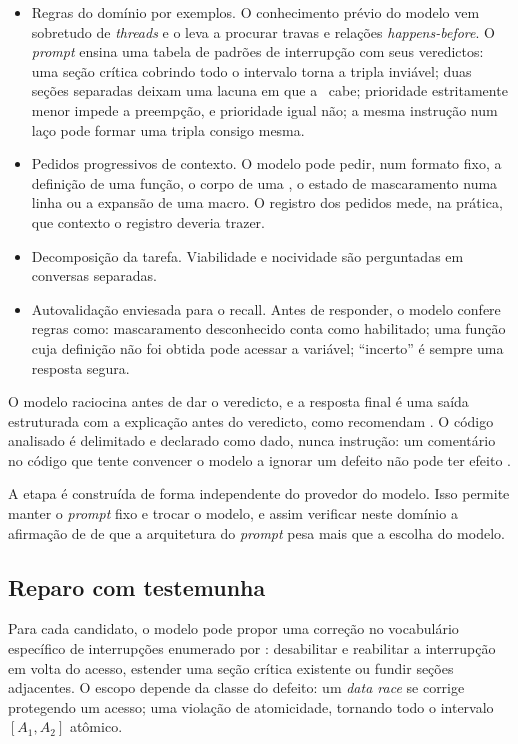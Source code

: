 \begin{itemize}
  \item Regras do domínio por exemplos. O conhecimento prévio do modelo
    vem sobretudo de \textit{threads} e o leva a procurar travas e relações
    \textit{happens-before}. O \textit{prompt} ensina uma tabela de padrões de
    interrupção com seus veredictos: uma seção crítica cobrindo todo o intervalo
    torna a tripla inviável; duas seções separadas deixam uma lacuna em que a
    \isr\ cabe; prioridade estritamente menor impede a preempção, e prioridade
    igual não; a mesma instrução num laço pode formar uma tripla consigo mesma.
  \item Pedidos progressivos de contexto. O modelo pode pedir, num
    formato fixo, a definição de uma função, o corpo de uma \isr, o estado de
    mascaramento numa linha ou a expansão de uma macro. O registro dos pedidos
    mede, na prática, que contexto o registro deveria trazer.
  \item Decomposição da tarefa. Viabilidade e nocividade são perguntadas
    em conversas separadas.
  \item Autovalidação enviesada para o recall. Antes de responder, o
    modelo confere regras como: mascaramento desconhecido conta como
    habilitado; uma função cuja definição não foi obtida pode acessar a
    variável; ``incerto'' é sempre uma resposta segura.
\end{itemize}

O modelo raciocina antes de dar o veredicto, e a resposta final é uma saída
estruturada com a explicação antes do veredicto, como recomendam
. O código analisado é delimitado e declarado como
dado, nunca instrução: um comentário no código que tente convencer o
modelo a ignorar um defeito não pode ter efeito \cite{sastgenius}.

A etapa é construída de forma independente do provedor do modelo. Isso permite
manter o \textit{prompt} fixo e trocar o modelo, e assim verificar neste domínio a
afirmação de  de que a arquitetura do \textit{prompt} pesa mais
que a escolha do modelo.

\subsection{Reparo com testemunha}

Para cada candidato, o modelo pode propor uma correção no vocabulário
específico de interrupções enumerado por : desabilitar e
reabilitar a interrupção em volta do acesso, estender uma seção crítica
existente ou fundir seções adjacentes. O escopo depende da classe do defeito:
um \textit{data race} se corrige protegendo um acesso; uma violação de
atomicidade, tornando todo o intervalo $[A_1, A_2]$ atômico.

